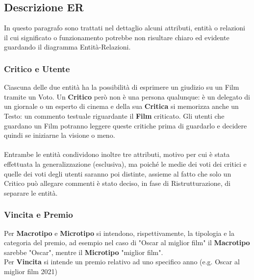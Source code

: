 \documentclass{article}
\begin{document}
\subsection{Descrizione ER}
In questo paragrafo sono trattati nel dettaglio alcuni attributi, entità o relazioni il cui significato o funzionamento potrebbe non risultare chiaro ed evidente guardando il diagramma Entità-Relazioni.

\subsubsection{Critico e Utente}
Ciascuna delle due entità ha la possibilità di esprimere un giudizio su un Film tramite un Voto. Un \textbf{Critico} però non è una persona qualunque: è un delegato di un giornale o un esperto di cinema e della sua \textbf{Critica} si memorizza anche un Testo: un commento testuale riguardante il \textbf{Film} criticato. Gli utenti che guardano un Film potranno leggere queste critiche prima di guardarlo e decidere quindi se iniziarne la visione o meno.
\\
\\
Entrambe le entità condividono inoltre tre attributi, motivo per cui è stata effettuata la generalizzazione (esclusiva), ma poiché le medie dei voti dei critici e quelle dei voti degli utenti saranno poi distinte, assieme al fatto che solo un Critico può allegare commenti è stato deciso, in fase di Ristrutturazione, di separare le entità. 

\subsubsection{Vincita e Premio}
Per \textbf{Macrotipo} e \textbf{Microtipo} si intendono, rispettivamente, la tipologia e la categoria del premio, ad esempio nel caso di "Oscar al miglior film" il \textbf{Macrotipo} sarebbe "Oscar", mentre il \textbf{Microtipo} "miglior film". \\
Per \textbf{Vincita} si intende un premio relativo ad uno specifico anno (e.g. Oscar al miglior film 2021)
\end{document}
